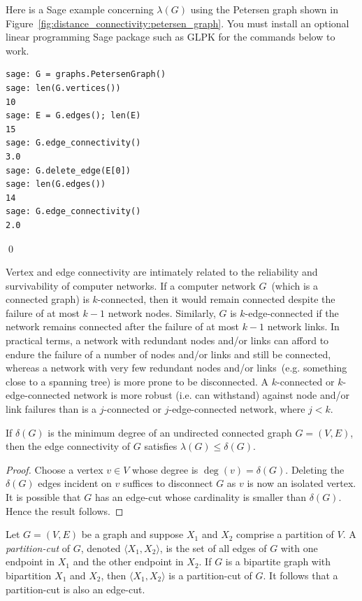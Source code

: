 \begin{example}
\rm
Here is a Sage example concerning $\lambda(G)$ using the
Petersen graph shown in
Figure~\ref{fig:distance_connectivity:petersen_graph}. You must
install an optional linear programming Sage package such as GLPK for
the commands below to work.
\begin{lstlisting}
sage: G = graphs.PetersenGraph()
sage: len(G.vertices())
10
sage: E = G.edges(); len(E)
15
sage: G.edge_connectivity()
3.0
sage: G.delete_edge(E[0])
sage: len(G.edges())
14
sage: G.edge_connectivity()
2.0
\end{lstlisting}
\qed
\end{example}

Vertex and edge connectivity are intimately related to the reliability
and survivability of computer networks. If a computer network
$G$~(which is a connected graph) is $k$-connected, then it would
remain connected despite the failure of at most $k - 1$ network
nodes. Similarly, $G$ is $k$-edge-connected if the network remains
connected after the failure of at most $k - 1$ network links. In
practical terms, a network with redundant nodes and/or links can
afford to endure the failure of a number of nodes and/or links and
still be connected, whereas a network with very few redundant nodes
and/or links~(e.g. something close to a spanning tree) is more prone
to be disconnected. A $k$-connected or $k$-edge-connected network is
more robust (i.e. can withstand) against node and/or link failures
than is a $j$-connected or $j$-edge-connected network, where $j < k$.

\begin{proposition}
\label{prop:distance_connectivity:edge_degree_inequality}
If $\delta(G)$ is the minimum degree of an undirected connected graph
$G = (V,E)$, then the edge connectivity of $G$ satisfies
$\lambda(G) \leq \delta(G)$.
\end{proposition}

\begin{proof}
Choose a vertex $v \in V$ whose degree is
$\deg(v) = \delta(G)$. Deleting the $\delta(G)$ edges incident on $v$
suffices to disconnect $G$ as $v$ is now an isolated vertex. It is
possible that $G$ has an edge-cut whose cardinality is smaller than
$\delta(G)$. Hence the result follows.
\end{proof}

Let $G = (V,E)$ be a graph and suppose $X_1$ and $X_2$ comprise a
partition of $V$. A \emph{partition-cut} of $G$, denoted
$\langle X_1, X_2 \rangle$, is the set of all edges of $G$ with one
endpoint in $X_1$ and the other endpoint in $X_2$. If $G$ is a
bipartite graph with bipartition $X_1$ and $X_2$, then
$\langle X_1, X_2 \rangle$ is a partition-cut of $G$. It follows that
a partition-cut is also an edge-cut.

